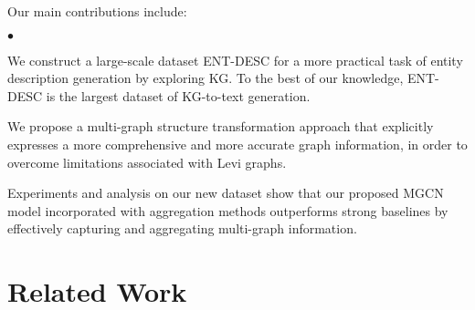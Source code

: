 \documentclass[11pt,a4paper]{article}
\newcommand{\squishlist}{
	\begin{list}{$\bullet$}
		{ \setlength{\itemsep}{0pt}
			\setlength{\parsep}{3pt}
			\setlength{\topsep}{3pt}
			\setlength{\partopsep}{0pt}
			\setlength{\leftmargin}{1.5em}
			\setlength{\labelwidth}{1em}
			\setlength{\labelsep}{0.5em} } }
\newcommand{\squishend}{
	\end{list} }
\begin{document}
Our main contributions include: 
\squishlist
\item
We construct a large-scale dataset ENT-DESC for a more practical task of entity description generation by exploring KG.
To the best of our knowledge, ENT-DESC is the largest dataset of KG-to-text generation.
\item
We propose a multi-graph structure transformation approach that explicitly expresses a more comprehensive and more accurate graph information, in order to overcome limitations associated with Levi graphs.
\item
Experiments and analysis on our new dataset show that our proposed MGCN model incorporated with aggregation methods outperforms strong baselines by effectively capturing and aggregating multi-graph information.


 \squishend


\section{Related Work}
\end{document}
